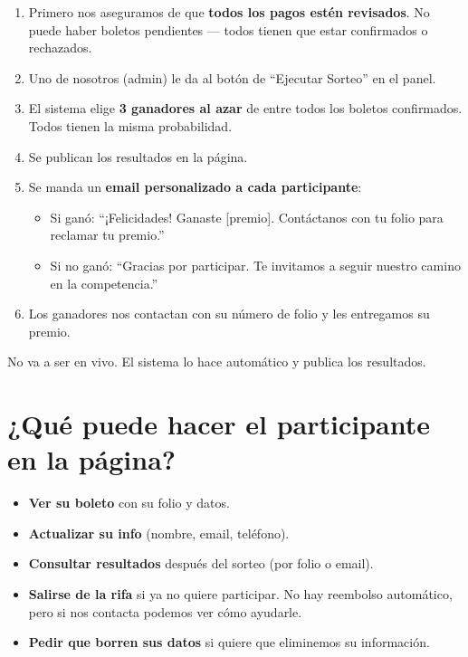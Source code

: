 \documentclass[12pt,a4paper]{article}
\begin{document}
\begin{enumerate}[leftmargin=2em]
    \item Primero nos aseguramos de que \textbf{todos los pagos estén revisados}. No puede haber boletos pendientes --- todos tienen que estar confirmados o rechazados.
    \item Uno de nosotros (admin) le da al botón de ``Ejecutar Sorteo'' en el panel.
    \item El sistema elige \textbf{3 ganadores al azar} de entre todos los boletos confirmados. Todos tienen la misma probabilidad.
    \item Se publican los resultados en la página.
    \item Se manda un \textbf{email personalizado a cada participante}:
    \begin{itemize}
        \item Si ganó: ``¡Felicidades! Ganaste [premio]. Contáctanos con tu folio para reclamar tu premio.''
        \item Si no ganó: ``Gracias por participar. Te invitamos a seguir nuestro camino en la competencia.''
    \end{itemize}
    \item Los ganadores nos contactan con su número de folio y les entregamos su premio.
\end{enumerate}

No va a ser en vivo. El sistema lo hace automático y publica los resultados.

\section{¿Qué puede hacer el participante en la página?}

\begin{itemize}[leftmargin=2em]
    \item \textbf{Ver su boleto} con su folio y datos.
    \item \textbf{Actualizar su info} (nombre, email, teléfono).
    \item \textbf{Consultar resultados} después del sorteo (por folio o email).
    \item \textbf{Salirse de la rifa} si ya no quiere participar. No hay reembolso automático, pero si nos contacta podemos ver cómo ayudarle.
    \item \textbf{Pedir que borren sus datos} si quiere que eliminemos su información.
\end{itemize}
\end{document}
